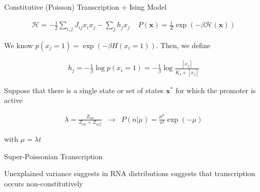 \documentclass[aspectratio=1610]{beamer}					%
\begin{document}
\begin{frame}{Constitutive (Poisson) Transcription + Ising Model}

\begin{align*}
\mathcal{H} = -\frac{1}{2}\sum_{i,j}J_{ij}x_{i}x_{j} - \sum_{j}h_{j}x_{j}\;\;\;\; P(\bm{x}) = \frac{1}{Z}\exp\left(-\beta \mathcal{H}(\bm{x})\right)
\end{align*}

We know $p(x_{j}=1) = \exp(-\beta H(x_{i}=1))$. Then, we define 

\begin{align*}
h_{j} = -\frac{1}{\beta}\log p(x_{i}=1) = -\frac{1}{\beta}\log \frac{[x_{j}]}{K_{j} + [x_{j}]}
\end{align*}

Suppose that there is a single state or set of states $\bm{x}^{*}$ for which the promoter is active

\begin{align*}
\lambda = \frac{Z_{on}}{Z_{on}+Z_{off}} \;\;\rightarrow\;\; P(n|\mu) = \frac{\mu^{n}}{n!}\exp(-\mu)
\end{align*}

with $\mu=\lambda t$

\end{frame}

\begin{frame}{Super-Poissonian Transcription}

Unexplained variance suggests in RNA distributions suggests that transcription occurs non-constitutively\\
\vspace{0.1in}


\end{frame}
\end{document}
